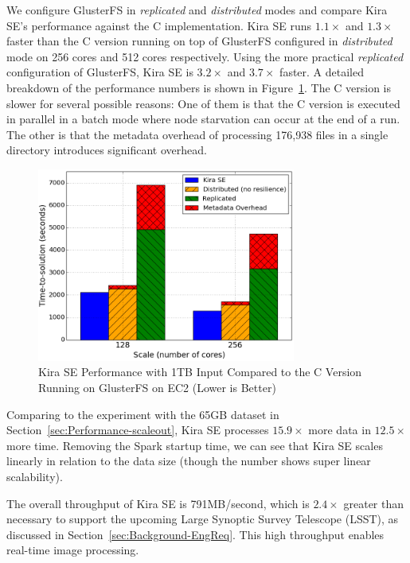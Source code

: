 \documentclass[10pt, conference, compsocconf]{IEEEtran}
\newcommand{\up}{\vspace*{-1em}}
\begin{document}
We configure GlusterFS in \emph{replicated} and \emph{distributed} modes and compare Kira
SE's performance against the C implementation. Kira SE runs $1.1\times$ and $1.3\times$ faster than the C version running on top of
GlusterFS configured in \emph{distributed} mode on 256 cores and 512 cores respectively. 
Using the more practical \emph{replicated} configuration of GlusterFS, Kira SE
is $3.2\times$ and $3.7\times$ faster. A detailed breakdown of the performance numbers is shown in Figure~\ref{fig:1tb-ec2}.
The C version is slower for several possible reasons: One of them is that the C version is executed in parallel in a batch mode 
where node starvation can occur at the end of a run. The other is that the metadata overhead of processing 176,938 files in a 
single directory introduces significant overhead.

\begin{figure}[t]
	\begin{center}
		\includegraphics[width=85mm]{pictures/1TB-EC2}
		\caption{Kira SE Performance with 1TB Input Compared to the C Version Running on GlusterFS on EC2 (Lower is Better)
		\label{fig:1tb-ec2}}
		\up
  	\end{center}
\end{figure}

Comparing to the experiment with the 65GB dataset in Section~\ref{sec:Performance-scaleout},
Kira SE processes $15.9\times$ more data in $12.5\times$ more time. Removing the Spark
startup time, we can see that Kira SE scales linearly in relation to the data size (though
the number shows super linear scalability).

The overall throughput of Kira SE is 791MB/second, which is $2.4\times$ greater than necessary
to support the upcoming Large Synoptic Survey Telescope (LSST), as discussed in
Section~\ref{sec:Background-EngReq}. This high throughput enables real-time image processing.
\end{document}
